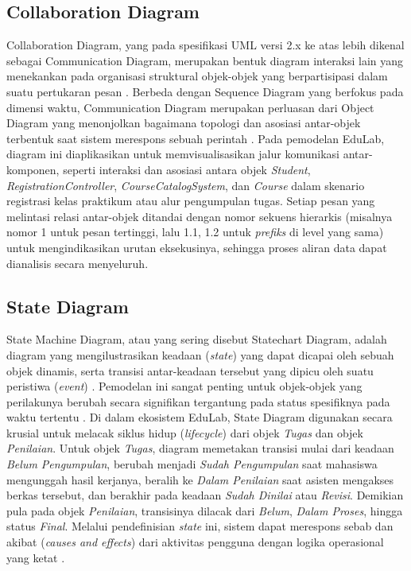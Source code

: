 \documentclass[12pt,a4paper,twoside]{report}
\begin{document}
\subsection{Collaboration Diagram}

Collaboration Diagram, yang pada spesifikasi UML versi 2.x ke atas lebih dikenal sebagai Communication Diagram, merupakan bentuk diagram interaksi lain yang menekankan pada organisasi struktural objek-objek yang berpartisipasi dalam suatu pertukaran pesan \cite{fowler2004}. Berbeda dengan Sequence Diagram yang berfokus pada dimensi waktu, Communication Diagram merupakan perluasan dari Object Diagram yang menonjolkan bagaimana topologi dan asosiasi antar-objek terbentuk saat sistem merespons sebuah perintah \cite{booch2005}. Pada pemodelan EduLab, diagram ini diaplikasikan untuk memvisualisasikan jalur komunikasi antar-komponen, seperti interaksi dan asosiasi antara objek \textit{Student}, \textit{RegistrationController}, \textit{CourseCatalogSystem}, dan \textit{Course} dalam skenario registrasi kelas praktikum atau alur pengumpulan tugas. Setiap pesan yang melintasi relasi antar-objek ditandai dengan nomor sekuens hierarkis (misalnya nomor 1 untuk pesan tertinggi, lalu 1.1, 1.2 untuk \textit{prefiks} di level yang sama) untuk mengindikasikan urutan eksekusinya, sehingga proses aliran data dapat dianalisis secara menyeluruh.

\subsection{State Diagram}

State Machine Diagram, atau yang sering disebut Statechart Diagram, adalah diagram yang mengilustrasikan keadaan (\textit{state}) yang dapat dicapai oleh sebuah objek dinamis, serta transisi antar-keadaan tersebut yang dipicu oleh suatu peristiwa (\textit{event}) \cite{fowler2004}. Pemodelan ini sangat penting untuk objek-objek yang perilakunya berubah secara signifikan tergantung pada status spesifiknya pada waktu tertentu \cite{dennis2015}. Di dalam ekosistem EduLab, State Diagram digunakan secara krusial untuk melacak siklus hidup (\textit{lifecycle}) dari objek \textit{Tugas} dan objek \textit{Penilaian}. Untuk objek \textit{Tugas}, diagram memetakan transisi mulai dari keadaan \textit{Belum Pengumpulan}, berubah menjadi \textit{Sudah Pengumpulan} saat mahasiswa mengunggah hasil kerjanya, beralih ke \textit{Dalam Penilaian} saat asisten mengakses berkas tersebut, dan berakhir pada keadaan \textit{Sudah Dinilai} atau \textit{Revisi}. Demikian pula pada objek \textit{Penilaian}, transisinya dilacak dari \textit{Belum}, \textit{Dalam Proses}, hingga status \textit{Final}. Melalui pendefinisian \textit{state} ini, sistem dapat merespons sebab dan akibat (\textit{causes and effects}) dari aktivitas pengguna dengan logika operasional yang ketat \cite{valdez2018}.
\end{document}
